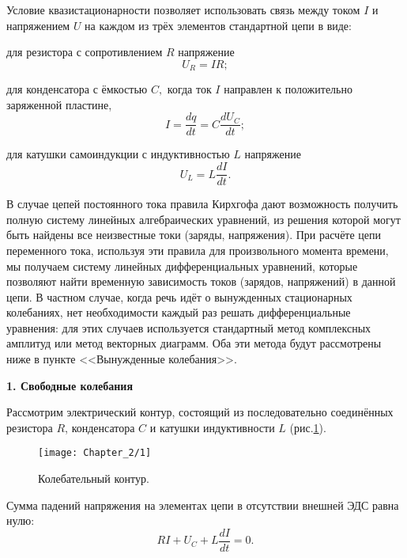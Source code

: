 Условие квазистационарности позволяет использовать связь меж\-ду током $I$ и напряжением $U$ на каждом из трёх элементов стандартной цепи в виде: 

для резистора с сопротивлением $R$ напряжение
\begin{equation}\label{2.1}
U_R=IR;
\end{equation}

для конденсатора с ёмкостью $C,$ когда ток $I$ направлен к по\-ло\-жи\-тель\-но заряженной пластине,
\begin{equation}\label{2.2}
I=\dfrac{dq}{dt}=C\dfrac{dU_C}{dt};
\end{equation}

для катушки самоиндукции с индуктивностью $L$ напряжение
\begin{equation}\label{2.3}
U_L=L\dfrac{dI}{dt}.
\end{equation}

В случае цепей постоянного тока правила Кирхгофа дают воз\-мож\-ность получить полную систему линейных алгебраических уравнений, из решения которой могут быть найдены все неизвестные токи (за\-ря\-ды, на\-пря\-же\-ния). При расчёте цепи переменного тока, ис\-поль\-зуя эти правила для произвольного момента времени, мы по\-лу\-ча\-ем систему линейных дифференциальных уравнений, которые поз\-во\-ля\-ют найти временную зависимость токов (зарядов, напряжений) в данной це\-пи. В частном случае, когда речь идёт о вынужденных ста\-ци\-онар\-ных колебаниях, нет необходимости каждый раз решать диффе\-рен\-ци\-аль\-ные уравнения: для этих случаев используется стандартный метод комплексных амплитуд или метод векторных диаграмм. Оба эти метода будут рассмотрены ниже в пункте <<Вынужденные ко\-ле\-ба\-ния>>.

\begin{center}
	\textbf{1. Свободные колебания}
\end{center}

Рассмотрим электрический контур, состоящий из пос\-ле\-до\-ва\-тель\-но соединённых резистора $R$, конденсатора $C$ и катушки ин\-дук\-тив\-нос\-ти $L$ (рис.\ref{fig1}). 

\begin{figure}[h!]
	\centering\texttt{[image: Chapter\_2/1]}
	\caption{Колебательный контур.}
	\label{fig1}
\end{figure}


Сумма падений напряжения на элементах цепи в отсутствии внешней ЭДС равна нулю:
\begin{equation}\label{2.4}
RI+U_C+L\dfrac{dI}{dt}=0.
\end{equation}


